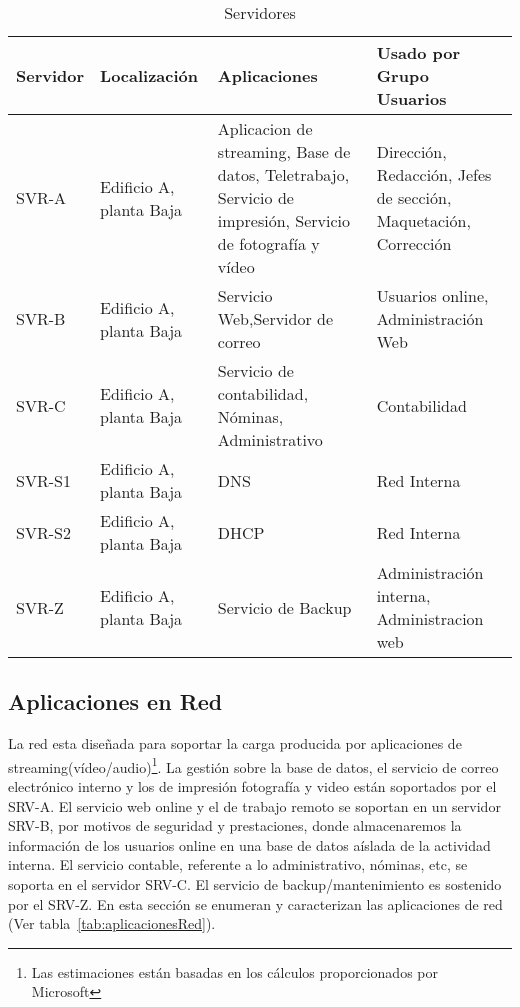 \documentclass[a4paper,onecolumn,11pt]{article}
\begin{document}
\begin{table}[htbp]
\small \sffamily
\caption{Servidores}
\begin{center}
\begin{tabular}{p{}p{}p{}p{}}
\toprule
\textbf{Servidor} & \textbf{Localización} & \textbf{Aplicaciones} & \textbf{Usado por Grupo Usuarios}\\
\toprule
SVR-A & Edificio A, planta Baja & Aplicacion de streaming, Base de datos, Teletrabajo, Servicio de impresión, Servicio de fotografía y vídeo & Dirección, Redacción, Jefes de sección, Maquetación, Corrección \\ \midrule
SVR-B & Edificio A, planta Baja & Servicio Web,Servidor de correo & Usuarios online, Administración Web\\ \midrule
SVR-C & Edificio A, planta Baja & Servicio de contabilidad, Nóminas, Administrativo & Contabilidad\\ \midrule
SVR-S1 & Edificio A, planta Baja & DNS & Red Interna\\ \midrule
SVR-S2 & Edificio A, planta Baja & DHCP  & Red Interna\\ \midrule
SVR-Z & Edificio A, planta Baja & Servicio de Backup  & Administración interna, Administracion web\\
\bottomrule
\end{tabular}
\end{center}
\label{tab:servidores}
\end{table}

\subsection{Aplicaciones en Red}

La red esta diseñada para soportar la carga producida por 
aplicaciones de streaming(vídeo/audio)\footnote{Las estimaciones están basadas en los cálculos proporcionados por Microsoft\cite{Streaming}}. La gestión sobre la base de datos, el servicio de correo electrónico interno y los de impresión fotografía y video están soportados por el SRV-A.
El servicio web online y el de trabajo remoto se soportan en un servidor SRV-B, por motivos de seguridad y prestaciones, donde almacenaremos la información de los 
usuarios online en una base de datos aíslada de la actividad interna.
El servicio contable, referente a lo administrativo, nóminas, etc, se soporta en el servidor SRV-C.
El servicio de backup/mantenimiento es sostenido por el SRV-Z.
En esta sección se enumeran y caracterizan las aplicaciones de red (Ver tabla~\ref{tab:aplicacionesRed}).
\end{document}
